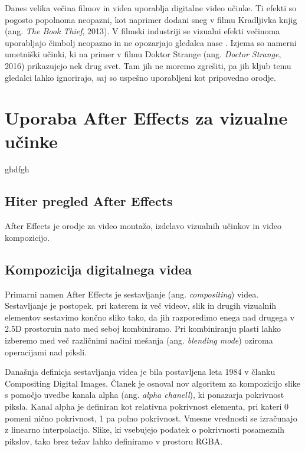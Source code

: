 \documentclass[a4paper, 12pt]{book}
\begin{document}
Danes velika večina filmov in videa uporablja digitalne video učinke. 
Ti efekti so pogosto popolnoma neopazni, kot naprimer dodani sneg v filmu Kradljivka knjig (ang. {\it The Book Thief}, 2013).
V filmski industriji se vizualni efekti večinoma uporabljajo čimbolj neopazno in ne opozarjajo gledalca nase \cite{vesHandbook}.
Izjema so namerni umetniški učinki, ki na primer v filmu Doktor Strange (ang. {\it Doctor Strange}, 2016) prikazujejo nek drug svet. 
Tam jih ne moremo zgrešiti, pa jih kljub temu gledalci lahko ignorirajo, saj so uspešno uporabljeni kot pripovedno orodje.


\chapter{Uporaba After Effects za vizualne učinke}

ghdfgh

\section{Hiter pregled After Effects}

After Effects je orodje za video montažo, izdelavo vizualnih učinkov in video kompozicijo.

\section{Kompozicija digitalnega videa}

Primarni namen After Effects je sestavljanje (ang. {\it compositing}) videa.
Sestavljanje je postopek, pri katerem iz več videov, slik in drugih vizualnih elementov sestavimo končno sliko tako,
da jih razporedimo enega nad drugega v 2.5D prostoru\footnotemark in nato med seboj kombiniramo\cite{siggraphcomposition}.
Pri kombiniranju plasti lahko izberemo med več različnimi načini mešanja (ang. {\it blending mode}) oziroma operacijami nad piksli.

Današnja definicja sestavljanja videa je bila postavljena leta 1984 v članku Compositing Digital Images\cite{siggraphComposition}.
Članek je osnoval nov algoritem za kompozicijo slike s pomočjo uvedbe kanala alpha (ang. {\it alpha chanell}), ki ponazarja pokrivnost piksla.
Kanal alpha je definiran kot relativna pokrivnost elementa, pri kateri 0 pomeni nično pokrivnost, 1 pa polno pokrivnost.
Vmesne vrednosti se izračunajo z linearno interpolacijo.
Slike, ki vsebujejo podatek o pokrivnosti posameznih pikslov, tako brez težav lahko definiramo v prostoru RGBA.
\end{document}
